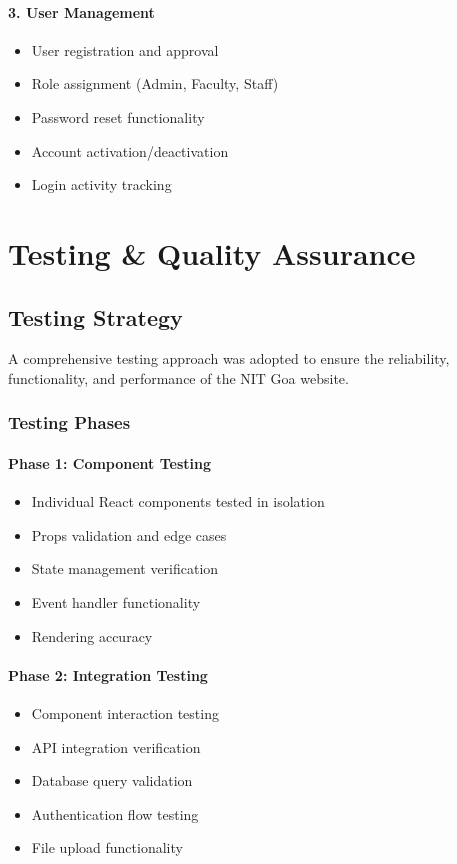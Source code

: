 \documentclass[12pt,a4paper]{report}
\begin{document}
\subsubsection*{3. User Management}
\begin{itemize}
    \item User registration and approval
    \item Role assignment (Admin, Faculty, Staff)
    \item Password reset functionality
    \item Account activation/deactivation
    \item Login activity tracking
\end{itemize}

\chapter{Testing \& Quality Assurance}

\section{Testing Strategy}

A comprehensive testing approach was adopted to ensure the reliability, functionality, and performance of the NIT Goa website.

\subsection{Testing Phases}

\subsubsection*{Phase 1: Component Testing}
\begin{itemize}
    \item Individual React components tested in isolation
    \item Props validation and edge cases
    \item State management verification
    \item Event handler functionality
    \item Rendering accuracy
\end{itemize}

\subsubsection*{Phase 2: Integration Testing}
\begin{itemize}
    \item Component interaction testing
    \item API integration verification
    \item Database query validation
    \item Authentication flow testing
    \item File upload functionality
\end{itemize}
\end{document}
